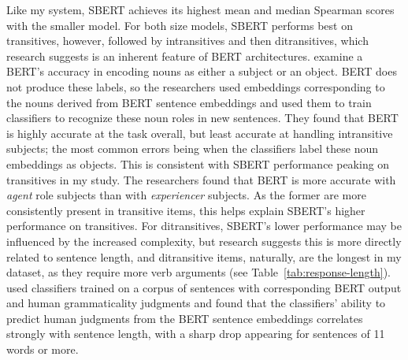 
Like my system, SBERT achieves its highest mean and median Spearman scores with the smaller model. For both size models, SBERT performs best on transitives, however, followed by intransitives and then ditransitives, which research suggests is an inherent feature of BERT architectures. \citet{papadimitriou2021multilingual} examine a BERT's accuracy in encoding nouns as either a subject or an object. BERT does not produce these labels, so the researchers used embeddings corresponding to the nouns derived from BERT sentence embeddings and used them to train classifiers to recognize these noun roles in new sentences. They found that BERT is highly accurate at the task overall, but least accurate at handling intransitive subjects; the most common errors being when the classifiers label these noun embeddings as objects. This is consistent with SBERT performance peaking on transitives in my study. The researchers found that BERT is more accurate with \textit{agent} role subjects than with \textit{experiencer} subjects. As the former are more consistently present in transitive items, this helps explain SBERT's higher performance on transitives. For ditransitives, SBERT's lower performance may be influenced by the increased complexity, but research suggests this is more directly related to sentence length, and ditransitive items, naturally, are the longest in my dataset, as they require more verb arguments (see Table~\ref{tab:response-length}). \citet{warstadt2019} used classifiers trained on a corpus of sentences with corresponding BERT output and human grammaticality judgments and found that the classifiers' ability to predict human judgments from the BERT sentence embeddings correlates strongly with sentence length, with a sharp drop appearing for sentences of 11 words or more. 

